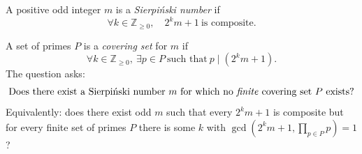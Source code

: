 A positive odd integer \(m\) is a \emph{Sierpi\'nski number} if
\[
\forall k\in\mathbb{Z}_{\ge 0},\quad 2^k m + 1\ \text{is composite}.
\]

A set of primes \(P\) is a \emph{covering set} for \(m\) if
\[
\forall k\in\mathbb{Z}_{\ge 0},\ \exists p\in P\ \text{such that}\ p\mid (2^k m+1).
\]
The question asks:
\[
\text{Does there exist a Sierpi\'nski number }m\text{ for which no \emph{finite} covering set }P\text{ exists?}
\]
Equivalently: does there exist odd \(m\) such that every \(2^k m+1\) is composite but for every finite set of primes \(P\) there is some \(k\) with \(\gcd(2^k m+1,\prod_{p\in P}p)=1\)?
